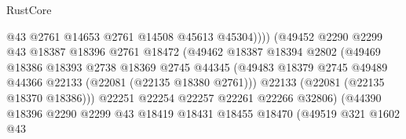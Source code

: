 \begin{lexlean}{RustCore}
\begin{coremodule}
                                            @43
                                            @2761
                                            @14653
                                            @2761
                                            @14508
                                            @45613
                                            @45304))))
                                    (@49452
                                      @2290
                                      @2299
                                      @43
                                      @18387
                                      @18396
                                      @2761
                                      @18472
                                      (@49462
                                        @18387
                                        @18394
                                        @2802
                                        (@49469
                                          @18386
                                          @18393
                                          @2738
                                          @18369
                                          @2745
                                          @44345
                                          (@49483
                                            @18379
                                            @2745
                                            @49489
                                            @44366
                                            @22133
                                            (@22081 (@22135 @18380 @2761)))
                                          @22133
                                          (@22081 (@22135 @18370 @18386)))
                                        @22251
                                        @22254
                                        @22257
                                        @22261
                                        @22266
                                        @32806)
                                      (@44390
                                        @18396
                                        @2290
                                        @2299
                                        @43
                                        @18419
                                        @18431
                                        @18455
                                        @18470
                                        (@49519
                                          @321
                                          @1602
                                          @43

\end{coremodule}
\end{lexlean}
